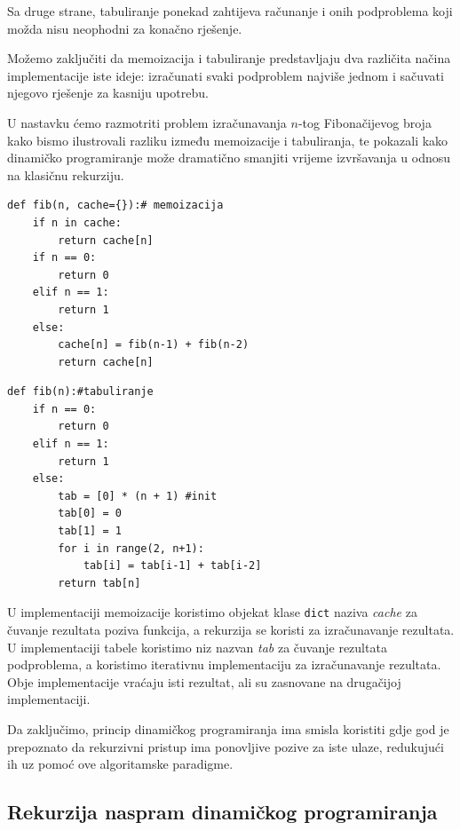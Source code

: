 Sa druge strane, tabuliranje ponekad zahtijeva računanje i onih podproblema koji možda nisu neophodni za konačno rješenje.

\medskip

Možemo zaključiti da memoizacija i tabuliranje predstavljaju dva različita načina implementacije iste ideje: izračunati svaki podproblem najviše jednom i sačuvati njegovo rješenje za kasniju upotrebu.

U nastavku ćemo razmotriti problem izračunavanja $n$-tog Fibonačijevog broja kako bismo ilustrovali razliku između memoizacije i tabuliranja, te pokazali kako dinamičko programiranje može dramatično smanjiti vrijeme izvršavanja u odnosu na klasičnu rekurziju.


\begin{verbatim}
def fib(n, cache={}):# memoizacija
    if n in cache:
        return cache[n]
    if n == 0:
        return 0
    elif n == 1:
        return 1
    else:
        cache[n] = fib(n-1) + fib(n-2)
        return cache[n]
\end{verbatim}

\begin{verbatim}  
def fib(n):#tabuliranje
    if n == 0:
        return 0
    elif n == 1:
        return 1
    else:
        tab = [0] * (n + 1) #init
        tab[0] = 0
        tab[1] = 1
        for i in range(2, n+1):
            tab[i] = tab[i-1] + tab[i-2]
        return tab[n]
\end{verbatim}
U implementaciji memoizacije koristimo objekat klase \texttt{dict} naziva \textit{cache} za čuvanje rezultata poziva funkcija, a rekurzija se koristi za izračunavanje rezultata. U implementaciji tabele koristimo niz nazvan \textit{tab} za čuvanje rezultata podproblema, a koristimo iterativnu impleme\-ntaciju za izračunava\-nje rezultata. Obje implementacije vraćaju isti rezultat, ali su zasnovane na drugačijoj implementaciji. %

Da zaključimo, princip dinamičkog programiranja ima smisla koristiti gdje god je prepoznato da rekurzivni pristup ima ponovljive pozive za iste ulaze, redukujući ih uz pomoć ove algoritamske paradigme.

\subsection{Rekurzija naspram dinamičkog programiranja}


